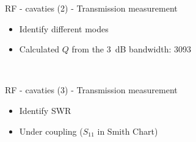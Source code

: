 \documentclass{beamer}
\begin{document}
\begin{frame}[t,fragile]{RF - cavaties (2) - Transmission measurement}
\begin{itemize}
\item Identify different modes 
\item Calculated $Q$ from the \SI{3}{\dB} bandwidth: \num{3093}
\begin{figure}
  \centering
  \quad
  \\
\end{figure}
\end{itemize}
\end{frame}

\begin{frame}[t,fragile]{RF - cavaties (3) - Transmission measurement}
\begin{itemize}
\item Identify SWR
\item Under coupling ($S_{11}$ in Smith Chart)
\begin{figure}
  \centering
  \quad
  \\
\end{figure}
\end{itemize}
\end{frame}
\end{document}
